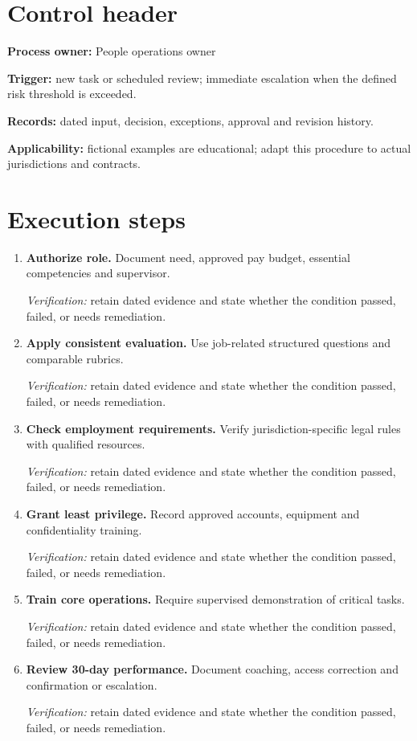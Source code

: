 \documentclass[11pt]{article}
\begin{document}
\SuiteOpen
\section{Control header}
\textbf{Process owner:} People operations owner\par\textbf{Trigger:} new task or scheduled review; immediate escalation when the defined risk threshold is exceeded.\par\textbf{Records:} dated input, decision, exceptions, approval and revision history.\par\textbf{Applicability:} fictional examples are educational; adapt this procedure to actual jurisdictions and contracts.
\section{Execution steps}
\begin{enumerate}[leftmargin=*,itemsep=8pt]
\item \textbf{Authorize role.} Document need, approved pay budget, essential competencies and supervisor.\par\textit{Verification:} retain dated evidence and state whether the condition passed, failed, or needs remediation.
\item \textbf{Apply consistent evaluation.} Use job-related structured questions and comparable rubrics.\par\textit{Verification:} retain dated evidence and state whether the condition passed, failed, or needs remediation.
\item \textbf{Check employment requirements.} Verify jurisdiction-specific legal rules with qualified resources.\par\textit{Verification:} retain dated evidence and state whether the condition passed, failed, or needs remediation.
\item \textbf{Grant least privilege.} Record approved accounts, equipment and confidentiality training.\par\textit{Verification:} retain dated evidence and state whether the condition passed, failed, or needs remediation.
\item \textbf{Train core operations.} Require supervised demonstration of critical tasks.\par\textit{Verification:} retain dated evidence and state whether the condition passed, failed, or needs remediation.
\item \textbf{Review 30-day performance.} Document coaching, access correction and confirmation or escalation.\par\textit{Verification:} retain dated evidence and state whether the condition passed, failed, or needs remediation.
\end{enumerate}
\end{document}
